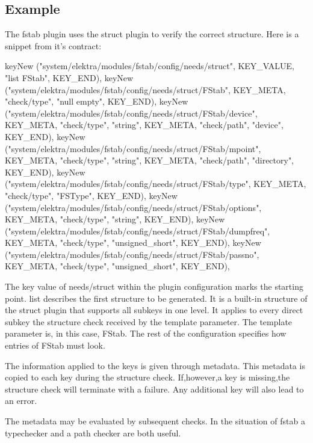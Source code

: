 \subsection*{Example}

The {\ttfamily fstab} plugin uses the {\ttfamily struct} plugin to verify the correct structure. Here is a snippet from it's contract\+: \begin{DoxyVerb}    keyNew ("system/elektra/modules/fstab/config/needs/struct", 
    KEY_VALUE, "list FStab",
    KEY_END), 
    keyNew ("system/elektra/modules/fstab/config/needs/struct/FStab",
    KEY_META, "check/type", "null empty", 
    KEY_END), 
    keyNew ("system/elektra/modules/fstab/config/needs/struct/FStab/device", 
    KEY_META, "check/type", "string", 
    KEY_META, "check/path", "device", 
    KEY_END), 
    keyNew ("system/elektra/modules/fstab/config/needs/struct/FStab/mpoint", 
    KEY_META, "check/type", "string", 
    KEY_META, "check/path", "directory", 
    KEY_END), 
    keyNew ("system/elektra/modules/fstab/config/needs/struct/FStab/type", 
    KEY_META, "check/type", "FSType", 
    KEY_END), 
    keyNew ("system/elektra/modules/fstab/config/needs/struct/FStab/options", 
    KEY_META, "check/type", "string", 
    KEY_END), 
    keyNew ("system/elektra/modules/fstab/config/needs/struct/FStab/dumpfreq", 
    KEY_META, "check/type", "unsigned_short", 
    KEY_END), keyNew ("system/elektra/modules/fstab/config/needs/struct/FStab/passno", 
    KEY_META, "check/type", "unsigned_short",
    KEY_END),
\end{DoxyVerb}


The key value of {\ttfamily needs/struct} within the plugin configuration marks the starting point. {\ttfamily list} describes the first structure to be generated. It is a built-\/in structure of the struct plugin that supports all subkeys in one level. It applies to every direct subkey the structure check received by the template parameter. The template parameter is, in this case, F\+Stab. The rest of the configuration specifies how entries of F\+Stab must look.

The information applied to the keys is given through metadata. This metadata is copied to each key during the structure check. If,however,a key is missing,the structure check will terminate with a failure. Any additional key will also lead to an error.

The metadata may be evaluated by subsequent checks. In the situation of fstab a typechecker and a path checker are both useful.

